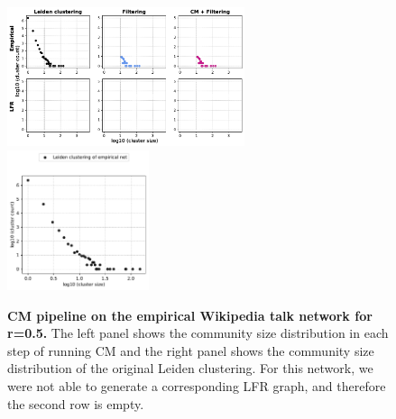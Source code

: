 \documentclass[a4paper]{article}   	%
\begin{document}
\begin{figure}[h!]
\centering
\includegraphics[width=0.62\textwidth]{figs/wiki_talk_cm_steps_lfr5.pdf}
\includegraphics[width=0.37\textwidth]{figs/wiki_talk_5_cm_size.pdf}
\caption[CM pipeline on the Wikipedia talk network for r=0.5]{\textbf{CM pipeline on the empirical Wikipedia talk network for r=0.5.} The left panel shows the community size distribution in each step of running CM and the right panel shows the community size distribution of the original Leiden clustering. For this network, we were not able to generate a corresponding LFR graph, and therefore the second row is empty.}
\label{fig:wikitalk-cm-lfr-5}
\end{figure}
\clearpage


\end{document}
